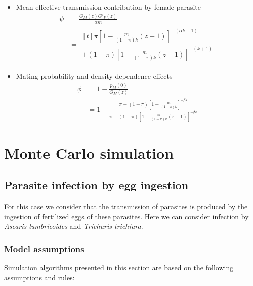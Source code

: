 \documentclass[12pt,a4paper]{article}
\theoremstyle{plain}%
\theoremstyle{definition}
\theoremstyle{remark}
\begin{document}
	\begin{itemize}
	\item Mean effective transmission contribution by female parasite
	\begin{equation}
	\begin{split}
	\psi&=\frac{G_M(z)G'_F(z)}{\alpha m}\\
	&=\begin{multlined}[t]
	\pi \left[ 1-\frac{m}{(1-\pi) k}(z-1)\right] ^{-(\alpha k+1)}\\
	+ (1-\pi) \left[ 1-\frac{m}{(1-\pi) k}(z-1)\right] ^{-(k+1)}
	\end{multlined}
	\end{split}
	\end{equation}
	
	\item Mating probability and density-dependence effects
	\begin{equation}
	\begin{split}
	\phi&= 1-\frac{p_M(0)}{G_M(z)}\\
	&=1- \frac{\pi + (1-\pi) \left[ 1+\frac{m}{(1-\pi) k}\right] ^{-\beta k}}{\pi + (1-\pi) \left[ 1-\frac{m}{(1-\pi) k}(z-1)\right] ^{-\beta k}} 
	\end{split}
	\end{equation}
	\end{itemize}

\section{Monte Carlo simulation}

\subsection{Parasite infection by egg ingestion}
For this case we consider that the transmission of parasites is produced by the ingestion of fertilized eggs of these parasites. Here we can consider infection by \textit{Ascaris lumbricoides} and \textit{Trichuris trichiura}.


\subsubsection{Model assumptions}
Simulation algorithms presented in this section are based on
the following assumptions and rules:
\end{document}
